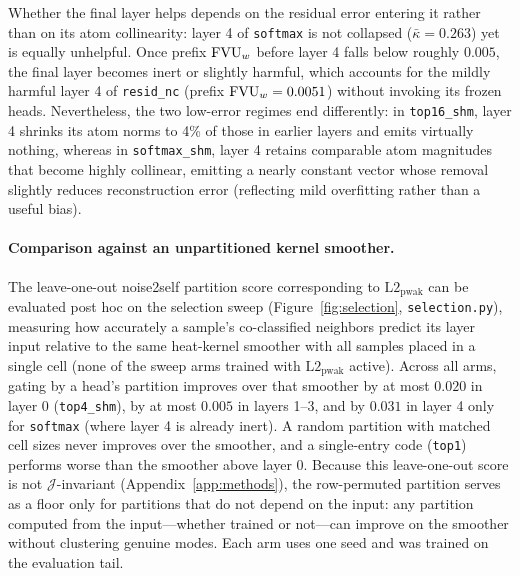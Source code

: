 Whether the final layer helps depends on the residual error entering it
rather than on its atom collinearity: layer 4 of \texttt{softmax} is not
collapsed ($\bar\kappa{=}0.263$) yet is equally unhelpful. Once prefix
$\mathrm{FVU}_w$ before layer 4 falls below roughly $0.005$, the final layer becomes
inert or slightly harmful, which accounts for the mildly harmful layer 4 of
\texttt{resid\_nc} (prefix $\mathrm{FVU}_w = 0.0051$) without invoking its frozen
heads. Nevertheless, the two low-error regimes end differently: in
\texttt{top16\_shm}, layer 4 shrinks its atom norms to 4\% of those in
earlier layers and emits virtually nothing, whereas in
\texttt{softmax\_shm}, layer 4 retains comparable atom magnitudes that
become highly collinear, emitting a nearly constant vector whose removal
slightly reduces reconstruction error (reflecting mild overfitting rather
than a useful bias).

\paragraph{Comparison against an unpartitioned kernel smoother.} The
leave-one-out noise2self partition score corresponding to
$\mathrm{L2}_{\mathrm{pwak}}$ can be evaluated post hoc on the selection
sweep (Figure~\ref{fig:selection}, \texttt{selection.py}), measuring how
accurately a sample's co-classified neighbors predict its layer input
relative to the same heat-kernel smoother with all samples placed in a
single cell (none of the sweep arms trained with
$\mathrm{L2}_{\mathrm{pwak}}$ active). Across all arms, gating by a head's
partition improves over that smoother by at most $0.020$ in layer 0
(\texttt{top4\_shm}), by at most $0.005$ in layers 1--3, and by $0.031$ in
layer 4 only for \texttt{softmax} (where layer 4 is already inert). A
random partition with matched cell sizes never improves over the smoother,
and a single-entry code (\texttt{top1}) performs worse than the smoother
above layer 0. Because this leave-one-out score is not
$\mathcal{J}$-invariant (Appendix~\ref{app:methods}), the row-permuted
partition serves as a floor only for partitions that do not depend on the
input: any partition computed from the input---whether trained or
not---can improve on the smoother without clustering genuine modes. Each
arm uses one seed and was trained on the evaluation tail.

